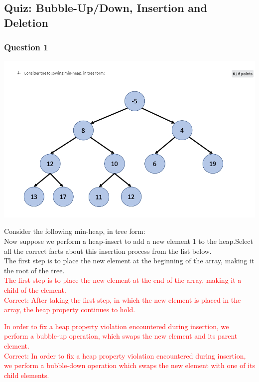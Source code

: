 \documentclass{article}
\begin{document}
\subsection{Quiz: Bubble-Up/Down, Insertion and Deletion}

\subsubsection{Question 1}


\includegraphics[width=\textwidth]{heapsortquestion1chart.png}



Consider the following min-heap, in tree form:\\
Now suppose we perform a heap-insert to add a new element 1 to the heap.Select all the correct facts about this insertion process from the list below.\\

The first step is to place the new element at the beginning of the array, making it the root of the tree.\\

\textcolor{red}{The first step is to place the new element at the end of the array, making it a child of the element.\\
Correct: After taking the first step, in which the new element is placed in the array, the heap property continues to hold.\\}

\textcolor{red}{In order to fix a heap property violation encountered during insertion, we perform a bubble-up operation, which swaps the new element and its parent element.\\
Correct: In order to fix a heap property violation encountered during insertion, we perform a bubble-down operation which swaps the new element with one of its child elements.\\}
\end{document}
